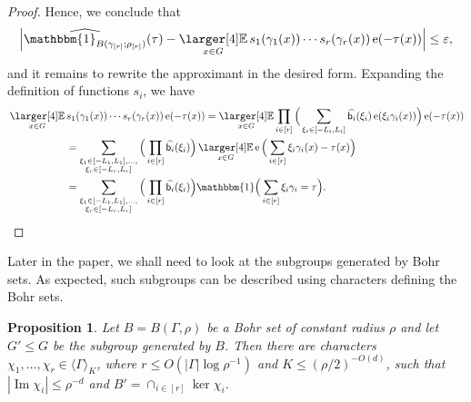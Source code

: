 \documentclass[a4paper,11pt]{article}
\numberwithin{theorem}{section}
\newtheorem{proposition}[theorem]{Proposition}
\theoremstyle{definition}
\newcommand\id{\mathbbm{1}}
\newcommand{\on}[1]{
	\operatorname{#1}
}
\newcommand\ssk[1]{
	\substack{#1}
}
\newcommand{\exx}{
  \mathop{
    \mathchoice{\vcenter{\hbox{\larger[4]$\mathbb{E}$}}}
               {\kern0pt\mathbb{E}}
               {\kern0pt\mathbb{E}}
               {\kern0pt\mathbb{E}}
  }\displaylimits
}
\begin{document}
\begin{proof}
    Hence, we conclude that 
    \[\Big|\widehat{\id_{B(\gamma_{[r]}; \rho_{[r]})}}(\tau) - \exx_{x \in G} s_1(\gamma_1(x))\cdots s_r(\gamma_r(x)) \on{e}(-\tau(x))\Big| \leq \varepsilon,\]
    and it remains to rewrite the approximant in the desired form. Expanding the definition of functions $s_i$, we have
    \begin{align*}&\exx_{x \in G} s_1(\gamma_1(x))\cdots s_r(\gamma_r(x)) \on{e}(-\tau(x)) = \exx_{x \in G} \prod_{i \in [r]} \Big(\sum_{\xi_i \in [-L_i, L_i]} \widehat{\mathsf{b}_i}(\xi_i) \on{e}(\xi_i \gamma_i(x))\Big) \on{e}(-\tau(x))\\
    &\hspace{2cm}=\sum_{\ssk{\xi_1 \in [-L_1, L_1], \dots,\\\xi_r \in [-L_r, L_r]}} \Big(\prod_{i \in [r]} \widehat{\mathsf{b}_i}(\xi_i)\Big) \exx_{x \in G} \on{e}\Big(\sum_{i \in [r]} \xi_i \gamma_i(x)-\tau(x)\Big)\\
    &\hspace{2cm}=\sum_{\ssk{\xi_1 \in [-L_1, L_1], \dots,\\\xi_r \in [-L_r, L_r]}} \Big(\prod_{i \in [r]} \widehat{\mathsf{b}_i}(\xi_i)\Big) \id\Big(\sum_{i \in [r]} \xi_i \gamma_i = \tau\Big).\qedhere\end{align*}
\end{proof}



Later in the paper, we shall need to look at the subgroups generated by Bohr sets. As expected, such subgroups can be described using characters defining the Bohr sets.\\

\begin{proposition}\label{subgroupgeneratedbybohrset}
    Let $B = B(\Gamma, \rho)$ be a Bohr set of constant radius $\rho$ and let $G' \leq G$ be the subgroup generated by $B$. Then there are characters $\chi_1, \dots, \chi_r \in \langle \Gamma \rangle_K$, where $r \leq O(|\Gamma| \log \rho^{-1})$ and $K \leq (\rho/2)^{-O(d)}$, such that $|\on{Im} \chi_i| \leq \rho^{-d}$ and $B' = \cap_{i \in [r]} \ker \chi_i$.
\end{proposition}
\end{document}
